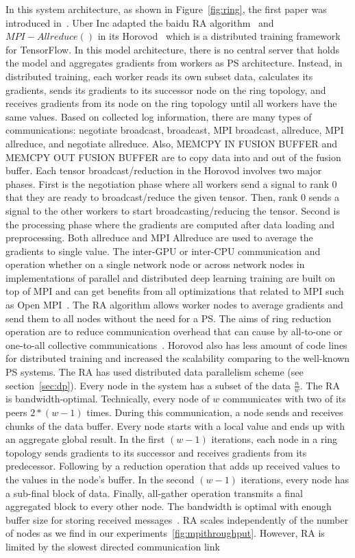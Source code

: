 \documentclass[conference]{IEEEtran}
\begin{document}
In this system architecture, as shown in Figure~\ref{fig:ring}, the first paper was introduced in~\cite{patarasuk2009bandwidth}. Uber Inc adapted the baidu RA algorithm~\cite{baidu-research_2017} and $MPI-Allreduce()$ in its Horovod~\cite{sergeev2018horovod} which is a distributed training framework for TensorFlow. In this model architecture, there is no central server that holds the model and aggregates gradients from workers as PS architecture. Instead, in distributed training, each worker reads its own subset data, calculates its gradients, sends its gradients to its successor node on the ring topology, and receives gradients from its node on the ring topology until all workers have the same values. Based on collected log information, there are many types of communications: negotiate broadcast, broadcast, MPI broadcast, allreduce, MPI allreduce, and negotiate allreduce. Also, MEMCPY IN FUSION BUFFER and MEMCPY OUT FUSION BUFFER are to copy data into and out of the fusion buffer. Each tensor broadcast/reduction in the Horovod involves two major phases. First is the negotiation phase where all workers send a signal to rank 0 that they are ready to broadcast/reduce the given tensor. Then, rank 0 sends a signal to the other workers to start broadcasting/reducing the tensor. Second is the processing phase where the gradients are computed after data loading and preprocessing. Both allreduce and MPI Allreduce are used to average the gradients to single value. The inter-GPU or inter-CPU communication and operation whether on a single network node or across network nodes in implementations of parallel and distributed deep learning training are built on top of MPI and can get benefits from all optimizations that related to MPI such as Open MPI~\cite{Gabriel04openmpi:}. The RA algorithm allows worker nodes to average gradients and send them to all nodes without the need for a PS. The aims of ring reduction operation are to reduce communication overhead that can cause by all-to-one or one-to-all collective communications~\cite{uberjourney}. Horovod also has less amount of code lines for distributed training and increased the scalability comparing to the well-known PS systems. The RA has used distributed data parallelism scheme (see section~\ref{sec:dp}). Every node in the system has a subset of the data $\frac{n}{w}$. The RA~\cite{patarasuk2009bandwidth} is bandwidth-optimal. Technically, every node of $w$ communicates with two of its peers $2*(w-1)$ times. During this communication, a node sends and receives chunks of the data buffer. Every node starts with a local value and ends up with an aggregate global result. In the first $(w-1)$ iterations, each node in a ring topology sends gradients to its successor and receives gradients from its predecessor. Following by a reduction operation that adds up received values to the values in the node's buffer. In the second $(w-1)$ iterations, every node has a sub-final block of data. Finally, all-gather operation transmits a final aggregated block to every other node. The bandwidth is optimal with enough buffer size for storing received messages~\cite{patarasuk2009bandwidth}. RA scales independently of the number of nodes as we find in our experiments~\ref{fig:mpithroughput}. However, RA is limited by the slowest directed communication link 
\end{document}
